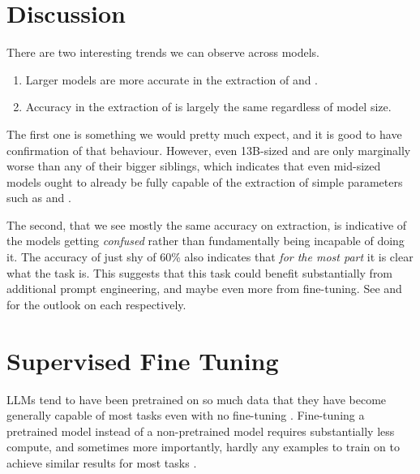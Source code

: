 

\section{Discussion}\label{sec:discussion}
There are two interesting trends we can observe across models.

\begin{enumerate}
    \item Larger models are more accurate in the extraction of \ttemp and \ttime.
    \item Accuracy in the extraction of \tsolv is largely the same regardless of model size.
\end{enumerate}

The first one is something we would pretty much expect, and it is good to have confirmation of that behaviour.
However, even 13B-sized  and  are only marginally worse than any of their bigger siblings, which indicates that even mid-sized models ought to already be fully capable of the extraction of simple parameters such as \ttemp and \ttime.

The second, that we see mostly the same accuracy on \tsolv extraction, is indicative of the models getting \textit{confused} rather than fundamentally being incapable of doing it.
The accuracy of just shy of 60\% also indicates that \textit{for the most part} it is clear what the task is.
This suggests that this task could benefit substantially from additional prompt engineering, and maybe even more from fine-tuning. See  and  for the outlook on each respectively.





\section{Supervised Fine Tuning}\label{sec:sft}
\glspl{LLM} tend to have been pretrained on so much data that they have become generally capable of most tasks even with no fine-tuning \cite{brown_language_2020}.
Fine-tuning a pretrained model instead of a non-pretrained model requires substantially less compute, and sometimes more importantly, hardly any examples to train on to achieve similar results for most tasks \cite{gaddipati_comparative_2020}.

